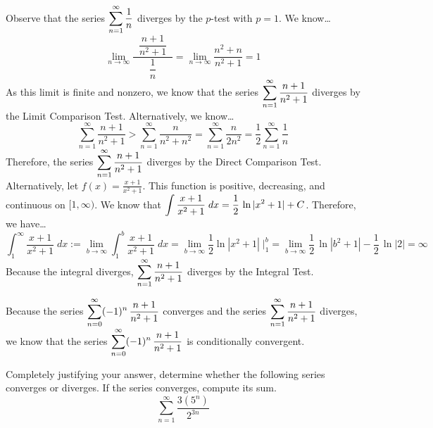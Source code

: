 \documentclass[12pt,letterpaper]{exam}
\begin{document}
\begin{questions}
{{Observe that the series $\displaystyle\sum_{n=1}^\infty \dfrac{1}{n}$ diverges by the $p$-test with $p= 1$. We know\dots
	\[
	\lim_{n \to \infty} \dfrac{\;\;\dfrac{n + 1}{n^2 + 1}\;\;}{\dfrac{1}{n}}= \lim_{n \to \infty} \dfrac{n^2 + n}{n^2 + 1}= 1
	\]
As this limit is finite and nonzero, we know that the series $\displaystyle\sum_{n=1}^\infty \dfrac{n + 1}{n^2 + 1}$ diverges by the Limit Comparison Test. Alternatively, we know\dots
	\[
	\sum_{n=1}^\infty \dfrac{n + 1}{n^2 + 1} > \sum_{n=1}^\infty \dfrac{n}{n^2 + n^2}= \sum_{n=1}^\infty \dfrac{n}{2n^2}= \dfrac{1}{2} \sum_{n=1}^\infty \dfrac{1}{n}
	\]
Therefore, the series $\displaystyle\sum_{n=1}^\infty \dfrac{n + 1}{n^2 + 1}$ diverges by the Direct Comparison Test. Alternatively, let $f(x)= \frac{x + 1}{x^2 + 1}$. This function is positive, decreasing, and continuous on $[1, \infty)$. We know that $\displaystyle\int \frac{x + 1}{x^2 + 1} \;dx= \frac{1}{2} \, \ln|x^2 + 1| + C$. Therefore, we have\dots
	\[
	\int_1^\infty \dfrac{x + 1}{x^2 + 1} \;dx:= \lim_{b \to \infty} \int_1^b \dfrac{x + 1}{x^2 + 1} \;dx= \lim_{b \to \infty} \dfrac{1}{2} \ln|x^2 + 1| \;\bigg|_1^b= \lim_{b \to \infty} \dfrac{1}{2}\, \ln|b^2 + 1| - \dfrac{1}{2} \, \ln|2|= \infty
	\]
Because the integral diverges, $\displaystyle\sum_{n=1}^\infty \dfrac{n + 1}{n^2 + 1}$ diverges by the Integral Test. \pspace

Because the series $\displaystyle\sum_{n=0}^\infty (-1)^n \, \dfrac{n + 1}{n^2 + 1}$ converges and the series $\displaystyle\sum_{n=1}^\infty \dfrac{n + 1}{n^2 + 1}$ diverges, we know that the series $\displaystyle\sum_{n=0}^\infty (-1)^n \, \dfrac{n + 1}{n^2 + 1}$ is conditionally convergent.}}
	


\newpage
\question[10] Completely justifying your answer, determine whether the following series converges or diverges. If the series converges, compute its sum. 
	\[
	\sum_{n=1}^\infty \dfrac{3 (5^n)}{2^{3n}}
	\] \pspace

\end{questions}
\end{document}
